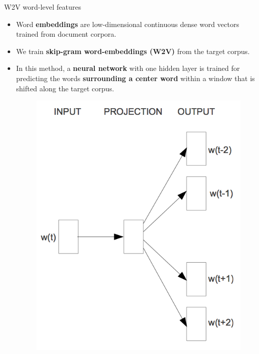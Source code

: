 \documentclass[handout]{beamer}
\begin{document}
\begin{frame}{W2V word-level features}
\begin{scriptsize}
\begin{itemize}
\item  Word \textbf{embeddings} are low-dimensional continuous dense word vectors trained from document corpora.
\item We train \textbf{skip-gram word-embeddings (W2V)}  from the target corpus. 
\item  In this method, a \textbf{neural network} with one hidden layer is trained for predicting the words \textbf{surrounding a center word} within a window that is shifted along the target corpus.

  \begin{figure}[h]
        	\includegraphics[scale = 0.45]{pics/skip-gram.png}
        \end{figure}

\end{itemize}
\end{scriptsize}
\end{frame}
\end{document}
